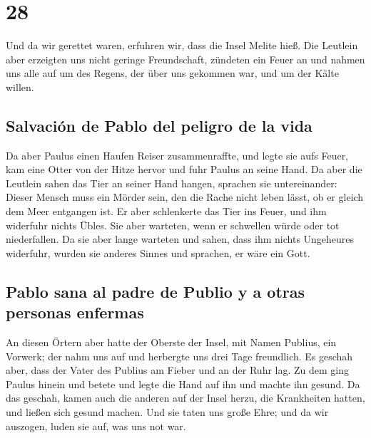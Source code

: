 \hypertarget{section-27}{%
\section{28}\label{section-27}}

 Und da wir gerettet waren, erfuhren wir, dass die Insel
Melite hieß.  Die Leutlein aber erzeigten uns nicht
geringe Freundschaft, zündeten ein Feuer an und nahmen uns alle auf um
des Regens, der über uns gekommen war, und um der Kälte willen.

\hypertarget{salvaciuxf3n-de-pablo-del-peligro-de-la-vida}{%
\subsection{Salvación de Pablo del peligro de la
vida}\label{salvaciuxf3n-de-pablo-del-peligro-de-la-vida}}

 Da aber Paulus einen Haufen Reiser zusammenraffte, und
legte sie aufs Feuer, kam eine Otter von der Hitze hervor und fuhr
Paulus an seine Hand.  Da aber die Leutlein sahen das Tier
an seiner Hand hangen, sprachen sie untereinander: Dieser Mensch muss
ein Mörder sein, den die Rache nicht leben lässt, ob er gleich dem Meer
entgangen ist.  Er aber schlenkerte das Tier ins Feuer,
und ihm widerfuhr nichts Übles.  Sie aber warteten, wenn
er schwellen würde oder tot niederfallen. Da sie aber lange warteten und
sahen, dass ihm nichts Ungeheures widerfuhr, wurden sie anderes Sinnes
und sprachen, er wäre ein Gott.

\hypertarget{pablo-sana-al-padre-de-publio-y-a-otras-personas-enfermas}{%
\subsection{Pablo sana al padre de Publio y a otras personas
enfermas}\label{pablo-sana-al-padre-de-publio-y-a-otras-personas-enfermas}}

 An diesen Örtern aber hatte der Oberste der Insel, mit
Namen Publius, ein Vorwerk; der nahm uns auf und herbergte uns drei Tage
freundlich.  Es geschah aber, dass der Vater des Publius
am Fieber und an der Ruhr lag. Zu dem ging Paulus hinein und betete und
legte die Hand auf ihn und machte ihn gesund.  Da das
geschah, kamen auch die anderen auf der Insel herzu, die Krankheiten
hatten, und ließen sich gesund machen.  Und sie taten uns
große Ehre; und da wir auszogen, luden sie auf, was uns not war.

